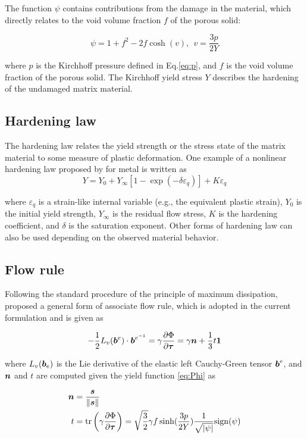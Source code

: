 The function $\psi$ contains contributions from the damage in the material, which directly relates to the void volume fraction $f$ of the porous solid:

\begin{equation}
\psi = 1 + f^2 - 2 f \cosh(v), ~~v=\frac{3p}{2 Y}
\end{equation}

where $p$ is the Kirchhoff pressure defined in Eq.\eqref{eq:p}, and $f$ is the void volume fraction of the porous solid. The Kirchhoff yield stress $Y$ describes the hardening of the undamaged matrix material. 

\subsection{Hardening law}
The hardening law relates the yield strength or the stress state of the matrix material to some measure of plastic deformation. One example of a nonlinear hardening law proposed by \cite{SimoHughes:98} for metal is written as 
\begin{equation}
Y =  Y_0 + Y_{\infty}\left[ 1-\exp(-\delta\varepsilon_q)\right] + K\varepsilon_q 
\end{equation}

where $\varepsilon_q$ is a strain-like internal variable (e.g., the equivalent plastic strain), $Y_0$ is the initial yield strength, $Y_{\infty}$ is the residual flow stress, $K$ is the hardening coefficient, and $\delta$ is the saturation exponent. Other forms of hardening law can also be used depending on the observed material behavior.

\subsection{Flow rule}
Following the standard procedure of the principle of maximum dissipation, \citep{Simo1992} proposed a general form of associate flow rule, which is adopted in the current formulation and is given as

\begin{equation}\label{eq:flowRule}
-\frac{1}{2}L_v({\boldsymbol{b}}^e)\cdot{\boldsymbol{b}}^{e^{-1}} = \gamma\frac{\partial\Phi}{\partial{\boldsymbol{\tau}}}=\gamma{\boldsymbol{n}} + \frac{1}{3}t\boldsymbol{1}
\end{equation}

where $L_v({\boldsymbol{b}}_e)$ is the Lie derivative of the elastic left Cauchy-Green tensor ${\boldsymbol{b}}^e$, and ${\boldsymbol{n}}$ and $t$ are computed given the yield function \eqref{eq:Phi} as

\begin{align}
{\boldsymbol{n}} &= \frac{{\boldsymbol{s}}}{\|{\boldsymbol{s}}\|}\label{eq:n}\\
t &= \operatorname{\text{tr}} \left( \gamma \frac{\partial\Phi}{\partial{\boldsymbol{\tau}}}\right) = \sqrt{\frac{3}{2}}\gamma f \sinh (\frac{3p}{2 Y})\frac{1}{\sqrt{|\psi|}} {\rm sign}(\psi)\label{eq:t}
\end{align}

